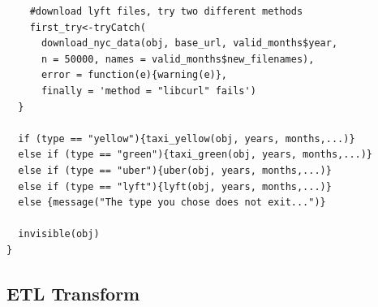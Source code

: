 \documentclass[12pt,twoside]{reedthesis}
\theoremstyle{definition}
\theoremstyle{definition}
\theoremstyle{definition}
\theoremstyle{remark}
\begin{document}
\begin{verbatim}
    #download lyft files, try two different methods
    first_try<-tryCatch(
      download_nyc_data(obj, base_url, valid_months$year, 
      n = 50000, names = valid_months$new_filenames),
      error = function(e){warning(e)},
      finally = 'method = "libcurl" fails')
  }
  
  if (type == "yellow"){taxi_yellow(obj, years, months,...)} 
  else if (type == "green"){taxi_green(obj, years, months,...)}
  else if (type == "uber"){uber(obj, years, months,...)}
  else if (type == "lyft"){lyft(obj, years, months,...)}
  else {message("The type you chose does not exit...")}
  
  invisible(obj)
}
\end{verbatim}
\subsection{ETL Transform}\label{etl-transform}
\end{document}
